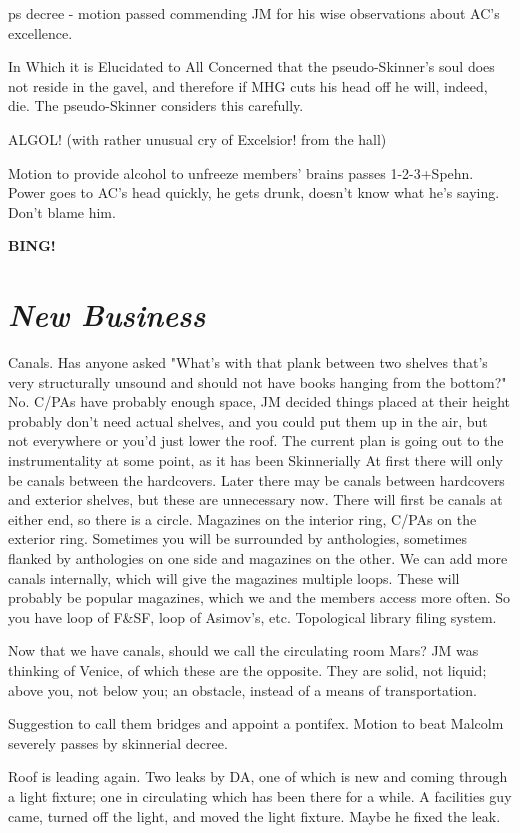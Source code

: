 \documentclass[10pt]{article}
\newcommand{\bing}{{\bf BING!} }
\newcommand{\goto}[1]{\bing \vskip 12pt \section*{{\em{#1}}}}
\begin{document}
ps decree - motion passed commending JM for his wise observations
about AC's excellence.

In Which it is Elucidated to All Concerned that the pseudo-Skinner's
soul does not reside in the gavel, and therefore if MHG cuts his head
off he will, indeed, die.  The pseudo-Skinner considers this
carefully.

ALGOL! (with rather unusual cry of Excelsior! from the hall)

Motion to provide alcohol to unfreeze members' brains passes
1-2-3+Spehn.  Power goes to AC's head quickly, he gets drunk, doesn't
know what he's saying.  Don't blame him.

\goto{New Business}

Canals.  Has anyone asked "What's with that plank between two shelves
that's very structurally unsound and should not have books hanging
from the bottom?"  No.  C/PAs have probably enough space, JM decided
things placed at their height probably don't need actual shelves, and
you could put them up in the air, but not everywhere or you'd just
lower the roof.  The current plan is going out to the instrumentality
at some point, as it has been Skinnerially At first there will only be
canals between the hardcovers.  Later there may be canals between
hardcovers and exterior shelves, but these are unnecessary now.  There
will first be canals at either end, so there is a circle.  Magazines
on the interior ring, C/PAs on the exterior ring.  Sometimes you will
be surrounded by anthologies, sometimes flanked by anthologies on one
side and magazines on the other.  We can add more canals internally,
which will give the magazines multiple loops.  These will probably be
popular magazines, which we and the members access more often.  So you
have loop of F\&SF, loop of Asimov's, etc.  Topological library filing
system.

Now that we have canals, should we call the circulating room Mars?  JM
was thinking of Venice, of which these are the opposite.  They are
solid, not liquid; above you, not below you; an obstacle, instead of a
means of transportation.

Suggestion to call them bridges and appoint a pontifex.
Motion to beat Malcolm severely passes by skinnerial decree.

Roof is leading again.  Two leaks by DA, one of which is new and
coming through a light fixture; one in circulating which has been
there for a while.  A facilities guy came, turned off the light, and
moved the light fixture.  Maybe he fixed the leak.
\end{document}
